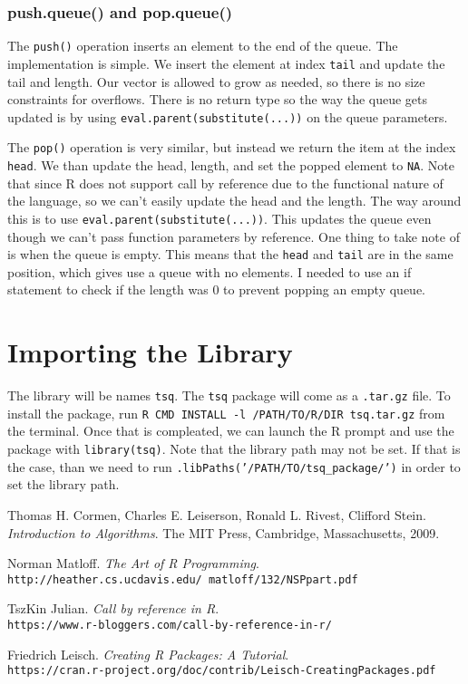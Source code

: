 \documentclass[11pt]{article}
\begin{document}
\subsubsection{push.queue() and pop.queue()}
The {\tt push()} operation inserts an element to the end of the queue. The implementation is simple. We insert the element at index {\tt tail} and update the tail and length. Our vector is allowed to grow as needed, so there is no size constraints for overflows. There is no return type so the way the queue gets updated is by using {\tt eval.parent(substitute(...))} on the queue parameters.

The {\tt pop()} operation is very similar, but instead we return the item at the index {\tt head}. We than update the head, length, and set the popped element to {\tt NA}. Note that since R does not support call by reference due to the functional nature of the language, so we can't easily update the head and the length. The way around this is to use {\tt eval.parent(substitute(...))}. This updates the queue even though we can't pass function parameters by reference. One thing to take note of is when the queue is empty. This means that the {\tt head} and {\tt tail} are in the same position, which gives use a queue with no elements. I needed to use an if statement to check if the length was $0$ to prevent popping an empty queue.
\section{Importing the Library}
The library will be names {\tt tsq}. The {\tt tsq} package will come as a {\tt .tar.gz} file. To install the package, run {\tt R CMD INSTALL -l /PATH/TO/R/DIR tsq.tar.gz} from the terminal. Once that is compleated, we can launch the R prompt and use the package with {\tt library(tsq)}. Note that the library path may not be set. If that is the case, than we need to run {\tt .libPaths('/PATH/TO/tsq\_package/')} in order to set the library path. 

\begin{thebibliography}{9}

Thomas H. Cormen, Charles E. Leiserson, Ronald L. Rivest, Clifford Stein.
\textit{Introduction to Algorithms}.
The MIT Press, Cambridge, Massachusetts, 2009.

Norman Matloff.
\textit{The Art of R Programming}.
\\\texttt{http://heather.cs.ucdavis.edu/~matloff/132/NSPpart.pdf}

TszKin Julian.
\textit{Call by reference in R}.
\\\texttt{https://www.r-bloggers.com/call-by-reference-in-r/}

Friedrich Leisch.
\textit{Creating R Packages: A Tutorial}.
\\\texttt{https://cran.r-project.org/doc/contrib/Leisch-CreatingPackages.pdf}

\end{thebibliography}
\end{document}
